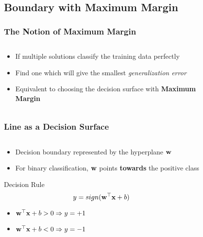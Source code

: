 \documentclass[10pt]{beamer}
\begin{document}
\subsection{Boundary with Maximum Margin}
\begin{frame}
      {
        \frametitle{The Notion of Maximum Margin}
      }
      \begin{columns}
        \begin{column}{0.6\textwidth}
          \begin{itemize}
          \item If multiple solutions classify the training data perfectly
          \item Find one which will give the smallest {\em generalization error}
          \item Equivalent to choosing the decision surface with {\bf\large Maximum Margin}
          \end{itemize}
        \end{column}
        \begin{column}{0.6\textwidth}
          \begin{figure}
            \centering
            
          \end{figure}
        \end{column}
      \end{columns}
\end{frame}
\begin{frame}
      {
        \frametitle{Line as a Decision Surface}
      }
      \begin{columns}
        \begin{column}{0.6\textwidth}
          \begin{itemize}
          \item Decision boundary represented by the hyperplane ${\bf w}$
          \item For binary classification, ${\bf w}$ points {\bf towards} the positive class
          \end{itemize}
          \begin{block}{Decision Rule}
            \[
            y = sign({\bf w}^\top{\bf x}  + b)
            \]
            \begin{itemize}
              \item ${\bf w}^\top{\bf x} + b > 0 \Rightarrow y = +1$
              \item ${\bf w}^\top{\bf x} + b < 0 \Rightarrow y = -1$
            \end{itemize}
      \end{block}
        \end{column}
        \begin{column}{0.4\textwidth}
          \begin{figure}
            
          \end{figure}
        \end{column}
      \end{columns}
\end{frame}
\end{document}
